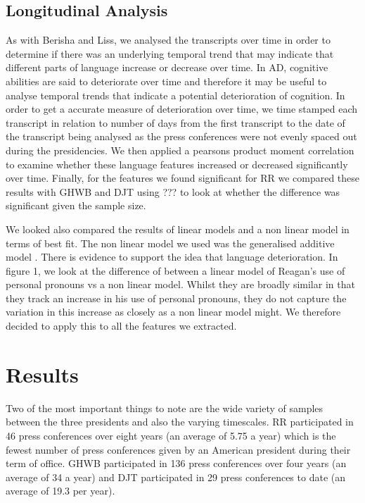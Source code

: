 \documentclass[12pt]{article}
\begin{document}
\subsection{Longitudinal Analysis}
As with Berisha and Liss\cite{Berisha2015}, we analysed the transcripts over time in order to determine if there was an underlying temporal trend that may indicate that different parts of language increase or decrease over time. In AD, cognitive abilities are said to deteriorate over time and therefore it may be useful to analyse temporal trends that indicate a potential deterioration of cognition. In order to get a accurate measure of deterioration over time, we time stamped each transcript in relation to number of days from the first transcript to the date of the transcript being analysed as the press conferences were not evenly spaced out during the presidencies. We then applied a pearsons product moment correlation to examine whether these language features increased or decreased significantly over time. Finally, for the features we found significant for RR we compared these results with GHWB and DJT using ??? to look at whether the difference was significant given the sample size. 
\par
We looked also compared the results of linear models and a non linear model in terms of best fit. The non linear model we used was the generalised additive model \cite{Hastie1986}.
There is evidence to support the idea that language deterioration. In figure 1, we look at the difference of between a linear model of Reagan's use of personal pronouns vs a non linear model. Whilst they are broadly similar in that they track an increase in his use of personal pronouns, they do not capture the variation in this increase as closely as a non linear model might. We therefore decided to apply this to all the features we extracted.

\section{Results}\label{results}
Two of the most important things to note are the wide variety of samples between the three presidents and also the varying timescales. RR participated in 46 press conferences over eight years (an average of 5.75 a year) which is the fewest number of press conferences given by an American president during their term of office. GHWB participated in 136 press conferences over four years (an average of 34 a year) and DJT participated in 29 press conferences to date (an average of 19.3 per year). 
\end{document}

